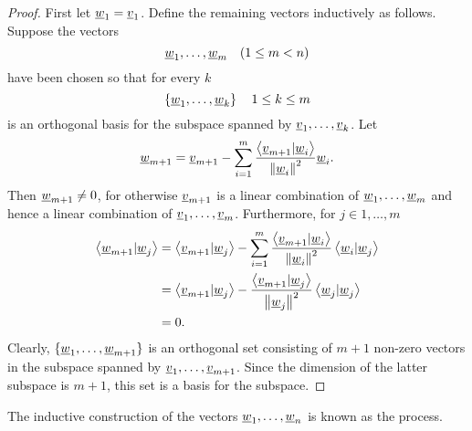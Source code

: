 \begin{proof}
First let $\underline{w}_1 = \underline{v}_1$.
Define the remaining vectors inductively as follows.
Suppose the vectors
\begin{equation*}
\underline{w}_1, \ldots, \underline{w}_m \quad (1 \leq m < n)
\end{equation*}
have been chosen so that for every $k$
\begin{equation*}
\left\{ \underline{w}_1, \ldots, \underline{w}_k \right\} \quad 1 \leq k \leq m
\end{equation*}
is an orthogonal basis for the subspace spanned by $\underline{v}_1, \ldots, \underline{v}_k$.
Let
\begin{equation*}
\underline{w}_{m+1} = \underline{v}_{m+1} - \sum_{i=1}^m \frac{ \left\langle \underline{v}_{m+1} | \underline{w}_i \right\rangle } { \left\| \underline{w}_i \right\|^2 } \underline{w}_i.
\end{equation*}
Then $\underline{w}_{m+1} \neq 0$, for otherwise $\underline{v}_{m+1}$ is a linear combination of $\underline{w}_1, \ldots, \underline{w}_m$ and hence a linear combination of $\underline{v}_1, \ldots, \underline{v}_m$.
Furthermore, for $j \in 1, \ldots, m$
\begin{equation*}
\begin{split}
\left\langle \underline{w}_{m+1} | \underline{w}_j \right\rangle
&= \left\langle \underline{v}_{m+1} | \underline{w}_j \right\rangle
- \sum_{i=1}^m \frac{ \left\langle \underline{v}_{m+1} | \underline{w}_i \right\rangle } { \left\| \underline{w}_i \right\|^2 }
\left\langle \underline{w}_i | \underline{w}_j \right\rangle \\
&= \left\langle \underline{v}_{m+1} | \underline{w}_j \right\rangle
- \frac{ \left\langle \underline{v}_{m+1} | \underline{w}_j \right\rangle } { \left\| \underline{w}_j \right\|^2 }
\left\langle \underline{w}_j | \underline{w}_j \right\rangle \\
&= 0.
\end{split}
\end{equation*}
Clearly, $\{ \underline{w}_1, \ldots, \underline{w}_{m+1} \}$ is an orthogonal set consisting of $m+1$ non-zero vectors in the subspace spanned by $\underline{v}_1, \ldots, \underline{v}_{m+1}$.
Since the dimension of the latter subspace is $m+1$, this set is a basis for the subspace.
\end{proof}

The inductive construction of the vectors $\underline{w}_1, \ldots, \underline{w}_n$ is known as the  process.

